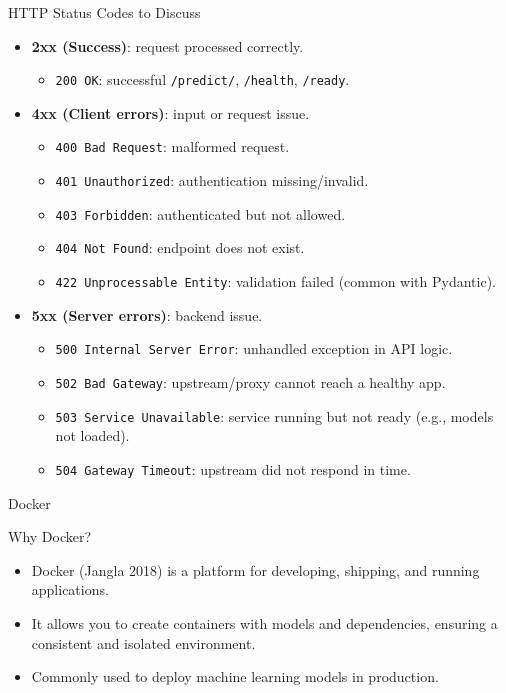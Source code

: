 \documentclass[
  ignorenonframetext,
]{beamer}
\providecommand{\tightlist}{%
  \setlength{\itemsep}{0pt}\setlength{\parskip}{0pt}}
\begin{document}
\begin{frame}[fragile]
\begin{block}{HTTP Status Codes to Discuss}
\label{http-status-codes-to-discuss}
\begin{itemize}
\tightlist
\item
  \textbf{2xx (Success)}: request processed correctly.

  \begin{itemize}
  \tightlist
  \item
    \texttt{200\ OK}: successful \texttt{/predict/}, \texttt{/health},
    \texttt{/ready}.
  \end{itemize}
\item
  \textbf{4xx (Client errors)}: input or request issue.

  \begin{itemize}
  \tightlist
  \item
    \texttt{400\ Bad\ Request}: malformed request.
  \item
    \texttt{401\ Unauthorized}: authentication missing/invalid.
  \item
    \texttt{403\ Forbidden}: authenticated but not allowed.
  \item
    \texttt{404\ Not\ Found}: endpoint does not exist.
  \item
    \texttt{422\ Unprocessable\ Entity}: validation failed (common with
    Pydantic).
  \end{itemize}
\item
  \textbf{5xx (Server errors)}: backend issue.

  \begin{itemize}
  \tightlist
  \item
    \texttt{500\ Internal\ Server\ Error}: unhandled exception in API
    logic.
  \item
    \texttt{502\ Bad\ Gateway}: upstream/proxy cannot reach a healthy
    app.
  \item
    \texttt{503\ Service\ Unavailable}: service running but not ready
    (e.g., models not loaded).
  \item
    \texttt{504\ Gateway\ Timeout}: upstream did not respond in time.
  \end{itemize}
\end{itemize}
\end{block}
\end{frame}

\begin{frame}{Docker}
\label{docker}
\begin{block}{Why Docker?}
\label{why-docker}
\begin{itemize}
\tightlist
\item
  Docker (Jangla 2018) is a platform for developing, shipping, and
  running applications.
\item
  It allows you to create containers with models and dependencies,
  ensuring a consistent and isolated environment.
\item
  Commonly used to deploy machine learning models in production.
\end{itemize}
\end{block}
\end{frame}
\end{document}
